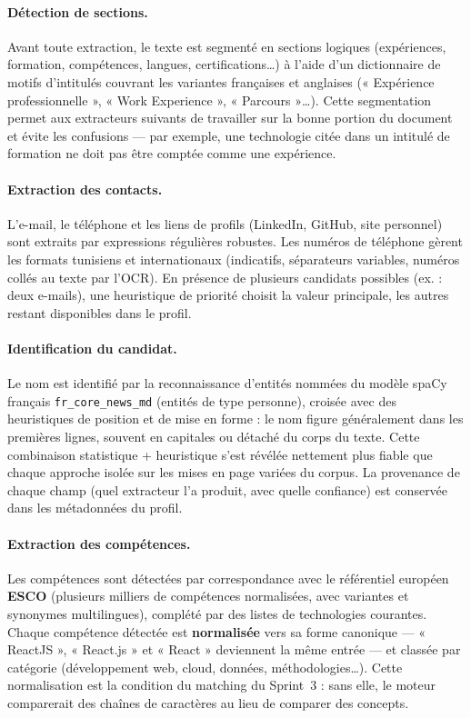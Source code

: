 \documentclass[12pt,a4paper]{report}
\begin{document}
\paragraph{Détection de sections.} Avant toute extraction, le texte est segmenté en sections logiques (expériences, formation, compétences, langues, certifications\ldots) à l'aide d'un dictionnaire de motifs d'intitulés couvrant les variantes françaises et anglaises (« Expérience professionnelle », « Work Experience », « Parcours »\ldots). Cette segmentation permet aux extracteurs suivants de travailler sur la bonne portion du document et évite les confusions --- par exemple, une technologie citée dans un intitulé de formation ne doit pas être comptée comme une expérience.

\paragraph{Extraction des contacts.} L'e-mail, le téléphone et les liens de profils (LinkedIn, GitHub, site personnel) sont extraits par expressions régulières robustes. Les numéros de téléphone gèrent les formats tunisiens et internationaux (indicatifs, séparateurs variables, numéros collés au texte par l'OCR). En présence de plusieurs candidats possibles (ex. : deux e-mails), une heuristique de priorité choisit la valeur principale, les autres restant disponibles dans le profil.

\paragraph{Identification du candidat.} Le nom est identifié par la reconnaissance d'entités nommées du modèle spaCy français \texttt{fr\_core\_news\_md} (entités de type personne), croisée avec des heuristiques de position et de mise en forme : le nom figure généralement dans les premières lignes, souvent en capitales ou détaché du corps du texte. Cette combinaison statistique + heuristique s'est révélée nettement plus fiable que chaque approche isolée sur les mises en page variées du corpus. La provenance de chaque champ (quel extracteur l'a produit, avec quelle confiance) est conservée dans les métadonnées du profil.

\paragraph{Extraction des compétences.} Les compétences sont détectées par correspondance avec le référentiel européen \textbf{ESCO} (plusieurs milliers de compétences normalisées, avec variantes et synonymes multilingues), complété par des listes de technologies courantes. Chaque compétence détectée est \textbf{normalisée} vers sa forme canonique --- « ReactJS », « React.js » et « React » deviennent la même entrée --- et classée par catégorie (développement web, cloud, données, méthodologies\ldots). Cette normalisation est la condition du matching du Sprint~3 : sans elle, le moteur comparerait des chaînes de caractères au lieu de comparer des concepts.
\end{document}
